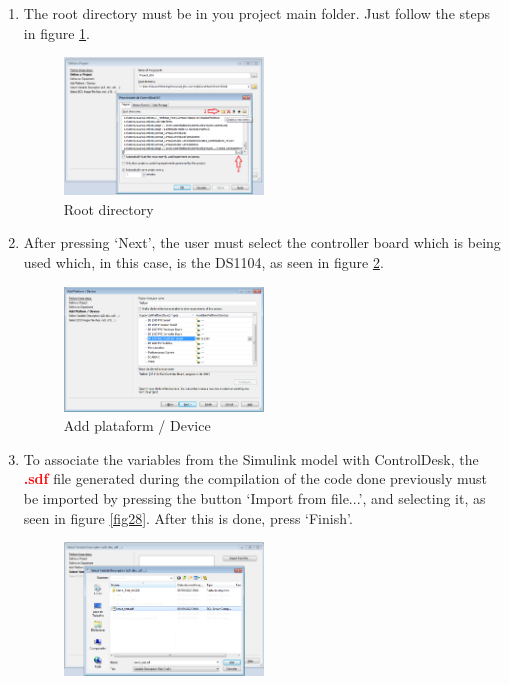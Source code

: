 \begin{enumerate}
    \item The root directory must be in you project main folder. Just follow the steps in figure \ref{fig26}. 
    \begin{figure}[H]
        \centering
        \includegraphics[width=0.5\textwidth]{Images/Ball and Bean/ControlDesk/CD3.png}
        \caption{Root directory}
        \label{fig26}
    \end{figure}
    \item After pressing ‘Next’, the user must select the controller board which is being used which, in this case, is the DS1104, as seen in figure \ref{fig27}.
    \begin{figure}[H]
        \centering
        \includegraphics[width=0.5\textwidth]{Images/Ball and Bean/ControlDesk/CD4.png}
        \caption{Add plataform / Device}
        \label{fig27}
    \end{figure}
    \item To associate the variables from the Simulink model with ControlDesk, the \textcolor{red}{\textbf{.sdf}} file generated during the compilation of the code done previously must be imported by pressing the button ‘Import from file...’, and selecting it, as seen in figure \ref{fig28}. After this is done, press ‘Finish’.
    \begin{figure}[H]
        \centering
        \includegraphics[width=0.5\textwidth]{Images/Ball and Bean/ControlDesk/CD5.png}

\end{figure}
\end{enumerate}
